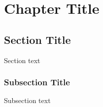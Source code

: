 
\chapter{Chapter Title}

    \section{Section Title}
    
        Section text
        
        \subsection{Subsection Title}
            
            Subsection text